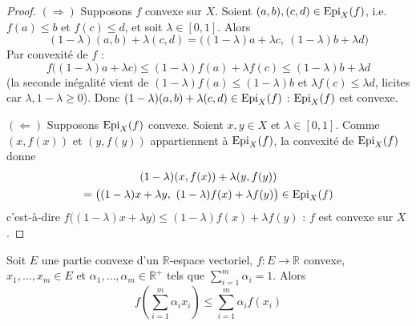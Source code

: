 \begin{proof}
$(\Rightarrow)$ Supposons $f$ convexe sur $X$. Soient $(a,b),(c,d)\in\operatorname{Epi}_X(f)$, i.e. $f(a)\leq b$ et $f(c)\leq d$, et soit $\lambda\in[0,1]$. Alors
\[(1-\lambda)(a,b)+\lambda(c,d) = \big((1-\lambda)a+\lambda c,\ (1-\lambda)b+\lambda d\big)\]
Par convexité de $f$ :
\[f\big((1-\lambda)a+\lambda c\big) \leq (1-\lambda)f(a)+\lambda f(c) \leq (1-\lambda)b+\lambda d\]
(la seconde inégalité vient de $(1-\lambda)f(a)\leq(1-\lambda)b$ et $\lambda f(c)\leq \lambda d$, licites car $\lambda,1-\lambda\geq 0$). Donc $(1-\lambda)(a,b)+\lambda(c,d)\in\operatorname{Epi}_X(f)$ : $\operatorname{Epi}_X(f)$ est convexe.

$(\Leftarrow)$ Supposons $\operatorname{Epi}_X(f)$ convexe. Soient $x,y\in X$ et $\lambda\in[0,1]$. Comme $(x,f(x))$ et $(y,f(y))$ appartiennent à $\operatorname{Epi}_X(f)$, la convexité de $\operatorname{Epi}_X(f)$ donne
\begin{multline*}
(1-\lambda)(x,f(x))+\lambda(y,f(y)) \\
= \big((1-\lambda)x+\lambda y,\ (1-\lambda)f(x)+\lambda f(y)\big) \in \operatorname{Epi}_X(f)
\end{multline*}
c'est-à-dire $f\big((1-\lambda)x+\lambda y\big) \leq (1-\lambda)f(x)+\lambda f(y)$ : $f$ est convexe sur $X$.
\end{proof}

\begin{theo}
Soit $E$ une partie convexe d'un $\mathbb{R}$-espace vectoriel, $f:E\to\mathbb{R}$ convexe, $x_1,\dots,x_m\in E$ et $\alpha_1,\dots,\alpha_m\in\mathbb{R}^+$ tels que $\displaystyle\sum_{i=1}^m \alpha_i=1$. Alors
\[f\left(\sum_{i=1}^m \alpha_i x_i\right) \leq \sum_{i=1}^m \alpha_i f(x_i)\]
\end{theo}

